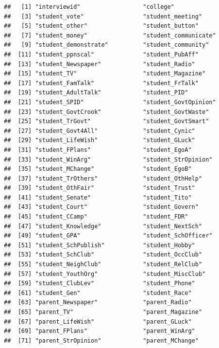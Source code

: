 \documentclass[
]{article}
\begin{document}
\begin{verbatim}
##   [1] "interviewid"                  "college"                     
##   [3] "student_vote"                 "student_meeting"             
##   [5] "student_other"                "student_button"              
##   [7] "student_money"                "student_communicate"         
##   [9] "student_demonstrate"          "student_community"           
##  [11] "student_ppnscal"              "student_PubAff"              
##  [13] "student_Newspaper"            "student_Radio"               
##  [15] "student_TV"                   "student_Magazine"            
##  [17] "student_FamTalk"              "student_FrTalk"              
##  [19] "student_AdultTalk"            "student_PID"                 
##  [21] "student_SPID"                 "student_GovtOpinion"         
##  [23] "student_GovtCrook"            "student_GovtWaste"           
##  [25] "student_TrGovt"               "student_GovtSmart"           
##  [27] "student_Govt4All"             "student_Cynic"               
##  [29] "student_LifeWish"             "student_GLuck"               
##  [31] "student_FPlans"               "student_EgoA"                
##  [33] "student_WinArg"               "student_StrOpinion"          
##  [35] "student_MChange"              "student_EgoB"                
##  [37] "student_TrOthers"             "student_OthHelp"             
##  [39] "student_OthFair"              "student_Trust"               
##  [41] "student_Senate"               "student_Tito"                
##  [43] "student_Court"                "student_Govern"              
##  [45] "student_CCamp"                "student_FDR"                 
##  [47] "student_Knowledge"            "student_NextSch"             
##  [49] "student_GPA"                  "student_SchOfficer"          
##  [51] "student_SchPublish"           "student_Hobby"               
##  [53] "student_SchClub"              "student_OccClub"             
##  [55] "student_NeighClub"            "student_RelClub"             
##  [57] "student_YouthOrg"             "student_MiscClub"            
##  [59] "student_ClubLev"              "student_Phone"               
##  [61] "student_Gen"                  "student_Race"                
##  [63] "parent_Newspaper"             "parent_Radio"                
##  [65] "parent_TV"                    "parent_Magazine"             
##  [67] "parent_LifeWish"              "parent_GLuck"                
##  [69] "parent_FPlans"                "parent_WinArg"               
##  [71] "parent_StrOpinion"            "parent_MChange"              

\end{verbatim}
\end{document}
